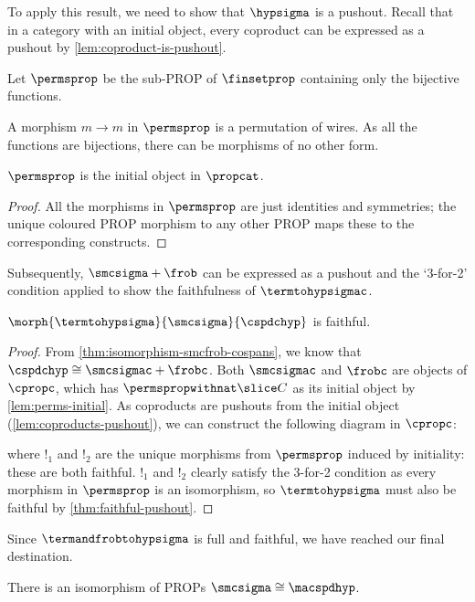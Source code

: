 To apply this result, we need to show that \(\hypsigma\) is a pushout.
Recall that in a category with an initial object, every coproduct can be
expressed as a pushout by \cref{lem:coproduct-is-pushout}.

\begin{definition}
    Let \(\permsprop\) be the sub-PROP of \(\finsetprop\)
    containing only the bijective functions.
\end{definition}

A morphism \(m \to m\) in \(\permsprop\) is a
permutation of wires.
As all the functions are bijections, there can be morphisms of no other form.

\begin{lemma}\label{lem:perms-initial}
    \(\permsprop\) is the initial object in \(\propcat\).
\end{lemma}
\begin{proof}
    All the morphisms in \(\permsprop\) are just
    identities and symmetries; the unique coloured PROP morphism to any other
    PROP maps these to the corresponding constructs.
\end{proof}

Subsequently, \(\smcsigma + \frob\) can be expressed as a pushout and the
`3-for-2' condition applied to show the faithfulness of \(\termtohypsigmac\).

\begin{proposition}
    \(\morph{\termtohypsigma}{\smcsigma}{\cspdchyp}\) is faithful.
\end{proposition}
\begin{proof}
    From \cref{thm:isomorphism-smcfrob-cospans}, we know that
    \(\cspdchyp \cong \smcsigmac + \frobc\).
    Both \(\smcsigmac\) and \(\frobc\) are objects of \(\cpropc\), which has
    \(\permspropwithnat \slice C\) as its initial object by
    \cref{lem:perms-initial}.
    As coproducts are pushouts from the initial object
    (\cref{lem:coproducts-pushout}), we can construct the following diagram in
    \(\cpropc\):
    \begin{center}
        
    \end{center}
    where \(!_1\) and \(!_2\) are the unique morphisms from
    \(\permsprop\) induced by initiality: these are both faithful.
    \(!_1\) and \(!_2\) clearly satisfy the 3-for-2 condition as every morphism
    in \(\permsprop\) is an isomorphism, so \(\termtohypsigma\) must also
    be faithful by \cref{thm:faithful-pushout}.
\end{proof}

Since \(\termandfrobtohypsigma\) is full and faithful, we have reached our
final destination.

\begin{corollary}
    There is an isomorphism of PROPs \(\smcsigma \cong \macspdhyp\).
\end{corollary}